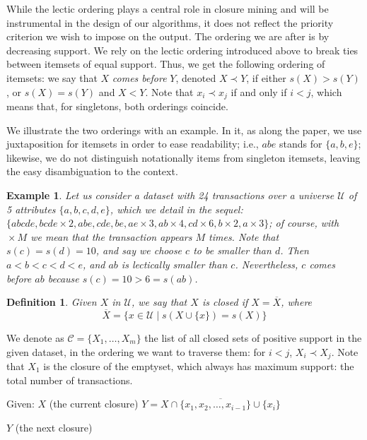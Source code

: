 \documentclass{article}
\newtheorem{definition}{Definition}
\newtheorem{example}{Example}
\newcommand{\st}[1]{%
  \sbox0{#1}%
  \usebox0%
  \llap{\rule[0.5ex]{\wd0}{0.4pt}}%
}
\def\U{\mathcal{U}}
\def\C{\mathcal{C}}
\def\s{\mathit{s}}
\newcommand{\cl}[1]{\overline{#1}}
\def\bef{\prec}
\begin{document}
While the lectic ordering plays a central role in closure mining and will be instrumental in the design of our algorithms, it does not reflect the priority criterion we wish to impose on the output.
The ordering we are after is by decreasing support. 
We rely on the lectic ordering introduced above to break ties between itemsets of equal support.
Thus, we get the following ordering of itemsets: we
say that $X$ \emph{comes before} $Y$, denoted $X\bef Y$, if 
either $\s(X)>\s(Y)$, or $\s(X)=\s(Y)$ and $X < Y$. Note that 
$x_i \bef x_j$ if and only if $i<j$, which means that, 
for singletons, both orderings coincide. 

We illustrate the two orderings with an example.
In it, as along the paper, we use juxtaposition for itemsets in order to ease readability; i.e., $abe$ stands for $\{a,b,e\}$; likewise, we do not distinguish
notationally items from singleton itemsets, leaving the easy disambiguation
to the context.

\begin{example}\label{example}
Let us consider a dataset with 24 transactions over a universe $\U$ of 5 attributes $\{a,b,c,d,e\}$, which we detail in the sequel: 
$\{abcde,bcde \times 2,abe,cde,be,ae \times 3,ab \times 4,cd \times 6, b \times 2, a \times 3\}$; of course, with ${}\times M$ we mean that the transaction 
appears $M$ times. Note that $\s(c)=\s(d)=10$, and say we choose $c$ to be smaller than $d$. Then $a<b<c<d<e$, and  $ab$ is lectically smaller than $c$. Nevertheless, $c$ comes before $ab$ because $\s(c)=10>6=\s(ab)$.
\end{example}

\begin{definition}\label{def:closed}
Given $X$ in $\U$, we say that $X$ is \emph{closed} if $X = \cl{X}$, where 
$$\cl{X} = \{x \in \U \mid \s(X \cup \{x\}) = \s(X)  \}$$
\end{definition}

We denote as $\C=\{X_1,\ldots,X_m\}$ the list of all closed 
sets of %
{positive} support in the given dataset,
in the ordering we want to traverse them: for $i<j$, 
$X_i \bef X_j$. Note that $X_1$ is the closure of the emptyset, which always has maximum support: the total number of transactions. 




\begin{algorithm}
  \caption{Ganter's \textsc{NextClosure}}\label{alg:Ganter}
  \begin{algorithmic}[1]
  	  \STATE Given: $X$ (the current closure)
            \STATE $Y = \cl{X  \cap \{x_1,x_2,\ldots,x_{i-1}\} \cup \{x_i\}}$
             
      		\RETURN $Y$ (the next closure)
            \ENDIF
         \ENDIF
      \ENDFOR
  \end{algorithmic}
\end{algorithm}
\end{document}
